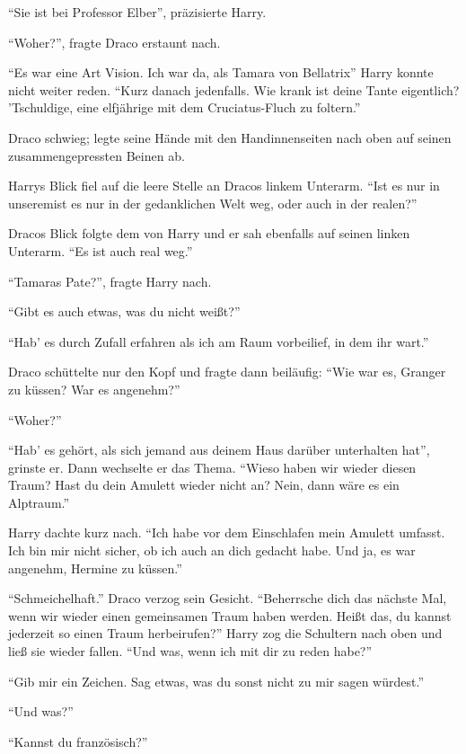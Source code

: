 \enquote{Sie ist bei Professor Elber}, präzisierte Harry.

\enquote{Woher?}, fragte Draco erstaunt nach.

\enquote{Es war eine Art Vision. Ich war da, als Tamara von Bellatrix\abs} Harry konnte nicht weiter reden. \enquote{Kurz danach jedenfalls. Wie krank ist deine Tante eigentlich? \gst ’Tschuldige, eine elfjährige mit dem Cruciatus-Fluch zu foltern.}

Draco schwieg; legte seine Hände mit den Handinnenseiten nach oben auf seinen zusammengepressten Beinen ab.

Harrys Blick fiel auf die leere Stelle an Dracos linkem Unterarm. \enquote{Ist es nur in unserem\abs ist es nur in der gedanklichen Welt weg, oder auch in der realen?}

Dracos Blick folgte dem von Harry und er sah ebenfalls auf seinen linken Unterarm. \enquote{Es ist auch real weg.}

\enquote{Tamaras Pate?}, fragte Harry nach.

\enquote{Gibt es auch etwas, was du nicht weißt?}

\enquote{Hab’ es durch Zufall erfahren als ich am Raum vorbeilief, in dem ihr wart.}

Draco schüttelte nur den Kopf und fragte dann beiläufig: \enquote{Wie war es, Granger zu küssen? War es angenehm?}

\enquote{Woher?}

\enquote{Hab’ es gehört, als sich jemand aus deinem Haus darüber unterhalten hat}, grinste er. Dann wechselte er das Thema. \enquote{Wieso haben wir wieder diesen Traum? Hast du dein Amulett wieder nicht an? \gst Nein, dann wäre es ein Alptraum.}

Harry dachte kurz nach. \enquote{Ich habe vor dem Einschlafen mein Amulett umfasst. Ich bin mir nicht sicher, ob ich auch an dich gedacht habe. \gst Und ja, es war angenehm, Hermine zu küssen.}

\enquote{Schmeichelhaft.} Draco verzog sein Gesicht. \enquote{Beherrsche dich das nächste Mal, wenn wir wieder einen gemeinsamen Traum haben werden. \gst Heißt das, du kannst jederzeit so einen Traum herbeirufen?} Harry zog die Schultern nach oben und ließ sie wieder fallen. \enquote{Und was, wenn ich mit dir zu reden habe?}

\enquote{Gib mir ein Zeichen. Sag etwas, was du sonst nicht zu mir sagen würdest.}

\enquote{Und was?}

\enquote{Kannst du französisch?}

